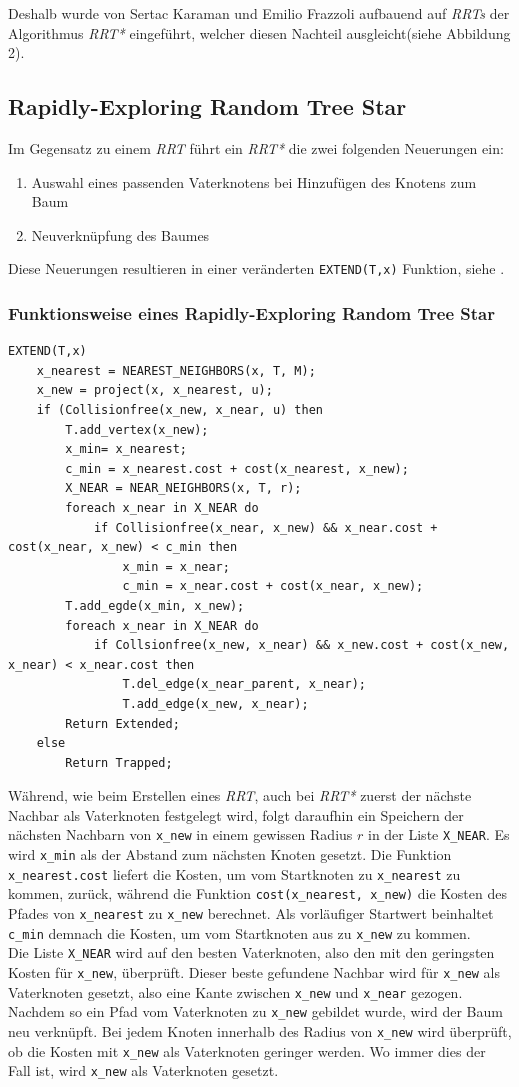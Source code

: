 Deshalb wurde von Sertac Karaman und Emilio Frazzoli aufbauend auf \textit{RRTs} der Algorithmus\textit{ RRT*} eingeführt, welcher diesen Nachteil ausgleicht(siehe Abbildung 2).
\subsection{Rapidly-Exploring Random Tree Star}
\label{RRT*}
Im Gegensatz zu einem \textit{RRT} führt ein \textit{RRT*} die zwei folgenden Neuerungen ein:
\begin{enumerate}
\item Auswahl eines passenden Vaterknotens bei Hinzufügen des Knotens zum Baum
\item Neuverknüpfung des Baumes
\end{enumerate}
Diese Neuerungen resultieren in einer veränderten \verb|EXTEND(T,x)| Funktion, siehe \citep{KaFra10}.
\subsubsection{Funktionsweise eines Rapidly-Exploring Random Tree Star}
\begin{lstlisting}
EXTEND(T,x)
	x_nearest = NEAREST_NEIGHBORS(x, T, M);
	x_new = project(x, x_nearest, u);
	if (Collisionfree(x_new, x_near, u) then
		T.add_vertex(x_new);
		x_min= x_nearest;
		c_min = x_nearest.cost + cost(x_nearest, x_new);
		X_NEAR = NEAR_NEIGHBORS(x, T, r);
		foreach x_near in X_NEAR do
			if Collisionfree(x_near, x_new) && x_near.cost + cost(x_near, x_new) < c_min then
				x_min = x_near;
				c_min = x_near.cost + cost(x_near, x_new);
		T.add_egde(x_min, x_new);
		foreach x_near in X_NEAR do
			if Collsionfree(x_new, x_near) && x_new.cost + cost(x_new, x_near) < x_near.cost then
				T.del_edge(x_near_parent, x_near);
				T.add_edge(x_new, x_near);
		Return Extended;
	else
		Return Trapped;
\end{lstlisting}

Während, wie beim Erstellen eines \textit{RRT}, auch bei \textit{RRT*} zuerst der nächste Nachbar als Vaterknoten festgelegt wird, folgt daraufhin ein Speichern der nächsten Nachbarn von \verb|x_new| in einem gewissen Radius $r$ in der Liste \verb|X_NEAR|. 
Es wird \verb|x_min| als der Abstand zum nächsten Knoten gesetzt. Die Funktion \verb|x_nearest.cost| liefert die Kosten, um vom Startknoten zu \verb|x_nearest| zu kommen, zurück, während die Funktion \verb|cost(x_nearest, x_new)| die Kosten des Pfades von \verb|x_nearest| zu \verb|x_new| berechnet. Als vorläufiger Startwert beinhaltet \verb|c_min| demnach die Kosten, um vom Startknoten aus zu \verb|x_new| zu kommen. \\
Die Liste \verb|X_NEAR| wird auf den besten Vaterknoten, also den mit den geringsten Kosten für \verb|x_new|, überprüft. Dieser beste gefundene Nachbar wird für \verb|x_new| als Vaterknoten gesetzt, also eine Kante zwischen \verb|x_new| und \verb|x_near| gezogen. \\
\label{sec:rewiring}
Nachdem so ein Pfad vom Vaterknoten zu \verb|x_new| gebildet wurde, wird der Baum neu verknüpft. Bei jedem Knoten innerhalb des Radius von \verb|x_new| wird überprüft, ob die Kosten mit \verb|x_new| als Vaterknoten geringer werden. Wo immer dies der Fall ist, wird \verb|x_new| als Vaterknoten gesetzt.
